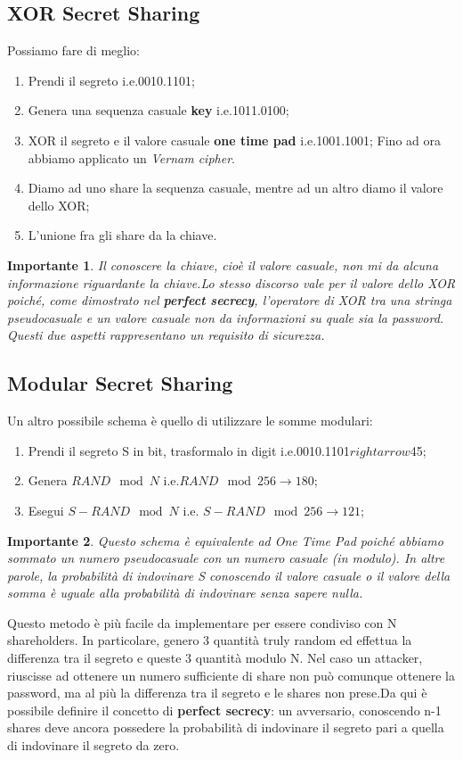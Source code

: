 \documentclass{book}
\newtheorem*{Importante}{\textbf{Importante}}
\begin{document}
\subsection{XOR Secret Sharing}
Possiamo fare di meglio:\begin{enumerate}
    \item Prendi il segreto i.e.0010.1101;
    \item Genera una sequenza casuale \textbf{key} i.e.1011.0100;
    \item XOR il segreto e il valore casuale \textbf{one time pad} i.e.1001.1001;\newline
          Fino ad ora abbiamo applicato un \emph{Vernam cipher}\@.
    \item Diamo ad uno share la sequenza casuale, mentre ad un altro diamo il valore dello XOR;\@
    \item L'unione fra gli share da la chiave\@.
\end{enumerate}
\begin{Importante}
    Il conoscere la chiave, cioè il valore casuale, non mi da alcuna informazione riguardante la chiave\@.\newline Lo stesso discorso vale per il valore dello XOR poiché, come dimostrato nel \textbf{perfect secrecy}, l'operatore di XOR tra una stringa pseudocasuale e un valore casuale non da informazioni su quale sia la password\@.\newline
    Questi due aspetti rappresentano un requisito di sicurezza\@.
\end{Importante}
\newpage
\subsection{Modular Secret Sharing}
Un altro possibile schema è quello di utilizzare le somme modulari:\begin{enumerate}
    \item Prendi il segreto S in bit, trasformalo in digit i.e.0010.1101\(rightarrow\)45;
    \item Genera \(RAND\mod{N}\) i.e.\(RAND\mod{256} \rightarrow  180\);
    \item Esegui \(S-RAND\mod{N}\) i.e. \(S-RAND\mod{256}\rightarrow  121\);
\end{enumerate}
\begin{Importante}
    Questo schema è equivalente ad One Time Pad poiché abbiamo sommato un numero pseudocasuale con un numero casuale (in modulo)\@. In altre parole, la probabilità di indovinare S conoscendo il valore casuale o il valore della somma è uguale alla probabilità di indovinare senza sapere nulla\@.
\end{Importante}
Questo metodo è più facile da implementare per essere condiviso con N shareholders\@. In particolare, genero 3 quantità truly random ed effettua la differenza tra il segreto e queste 3 quantità modulo N\@.
Nel caso un attacker, riuscisse ad ottenere un numero sufficiente di share non può comunque ottenere la password, ma al più la differenza tra il segreto e le shares non prese\@.\newline Da qui è possibile definire il concetto di \textbf{perfect secrecy}: un avversario, conoscendo n-1 shares deve ancora possedere la probabilità di indovinare il segreto pari a quella di indovinare il segreto da zero\@.
\end{document}
